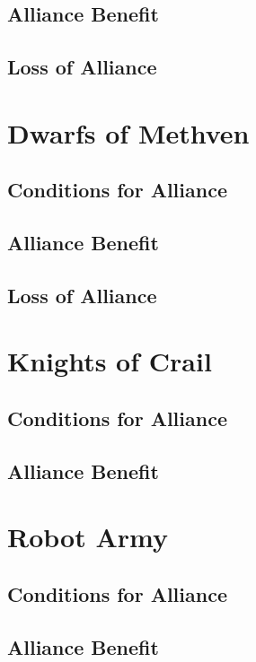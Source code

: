 \subsection*{Alliance Benefit}
\subsection*{Loss of Alliance}

\section*{Dwarfs of Methven}\label{alliance:MethvenDwarfs}
\subsection*{Conditions for Alliance}
\subsection*{Alliance Benefit}
\subsection*{Loss of Alliance}

\section*{Knights of Crail}\label{alliance:KnightOfCrail}
\subsection*{Conditions for Alliance}
\subsection*{Alliance Benefit}

\section*{Robot Army}\label{alliance:RobotArmy}
\subsection*{Conditions for Alliance}
\subsection*{Alliance Benefit}
